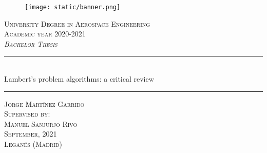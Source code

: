 \begin{titlepage}

  \begin{center}

    \begin{figure}[h]
      \centering
      \texttt{[image: static/banner.png]}
    \end{figure}
    \vspace{1cm}


    \textsc{\large
      University Degree in Aerospace Engineering
    }\\[0.25cm]
    \textsc{\large
      Academic year 2020-2021
    }\\[1.5cm]
    \textsc{\large
      \textit{Bachelor Thesis}
    }\\[1.75cm]

    \noindent\rule{\textwidth}{1pt}
    \\[0.25cm]
    {
    \fontsize{35pt}{35pt}\selectfont
    {
      Lambert's problem algorithms: a critical review
    }
    }
    \noindent\rule{\textwidth}{1pt}

    \vspace{1.5cm}
    \textsc{\Large
      Jorge Martínez Garrido
    }\\[4cm]
    \textsc{\large
      Supervised by:
    }\\[0.25cm]
    \textsc{\large
      Manuel Sanjurjo Rivo
    }\\[3cm]


    \textsc{\large
       September, 2021
    }\\[0.25cm]
    \textsc{\large
       Leganés (Madrid)
    }\\[0.25cm]

  \end{center}
\end{titlepage}
